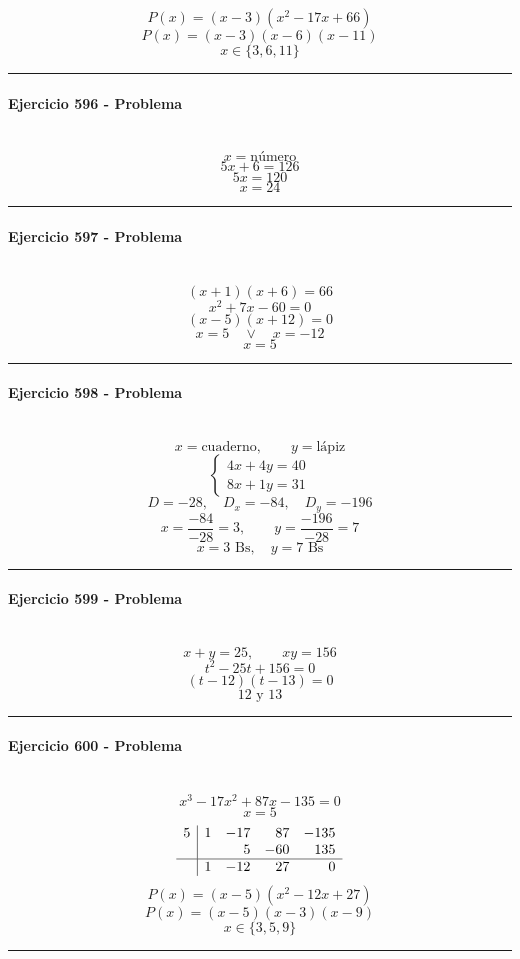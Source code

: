 \documentclass[10pt,a4paper]{article}
\newcommand{\res}[1]{\paragraph{#1}\mbox{}\\[-1.2em]}
\begin{document}
\[ P(x)=(x-3)(x^{2} - 17 x + 66) \]
\[ P(x)=(x-3)(x-6)(x-11) \]
\[ \boxed{x\in\{3,6,11\}} \]
\vspace{1mm}\hrule\vspace{2mm}
\res{Ejercicio 596 - Problema}
\[ x=\text{número} \]
\[ 5x+6=126 \]
\[ 5x=120 \]
\[ \boxed{x=24} \]
\vspace{1mm}\hrule\vspace{2mm}
\res{Ejercicio 597 - Problema}
\[ (x+1)(x+6)=66 \]
\[ x^{2} + 7 x - 60=0 \]
\[ (x-5)(x+12)=0 \]
\[ x=5\quad \vee \quad x=-12 \]
\[ \boxed{x=5} \]
\vspace{1mm}\hrule\vspace{2mm}
\res{Ejercicio 598 - Problema}
\[ x=\text{cuaderno},\qquad y=\text{lápiz} \]
\[ \begin{cases}4x+4y=40\\8x+1y=31\end{cases} \]
\[ D=-28,\quad D_x=-84,\quad D_y=-196 \]
\[ x=\frac{-84}{-28}=3,\qquad y=\frac{-196}{-28}=7 \]
\[ \boxed{x=3\text{ Bs},\quad y=7\text{ Bs}} \]
\vspace{1mm}\hrule\vspace{2mm}
\res{Ejercicio 599 - Problema}
\[ x+y=25,\qquad xy=156 \]
\[ t^2-25t+156=0 \]
\[ (t-12)(t-13)=0 \]
\[ \boxed{12\text{ y }13} \]
\vspace{1mm}\hrule\vspace{2mm}
\res{Ejercicio 600 - Problema}
\[ x^{3} - 17 x^{2} + 87 x - 135=0 \]
\[ x=5 \]
\[\begin{array}{r|rrrr}5 & 1 & -17 & 87 & -135\\  &  & 5 & -60 & 135\\\hline  & 1 & -12 & 27 & 0\end{array}\]
\[ P(x)=(x-5)(x^{2} - 12 x + 27) \]
\[ P(x)=(x-5)(x-3)(x-9) \]
\[ \boxed{x\in\{3,5,9\}} \]
\vspace{1mm}\hrule\vspace{2mm}
\end{document}
